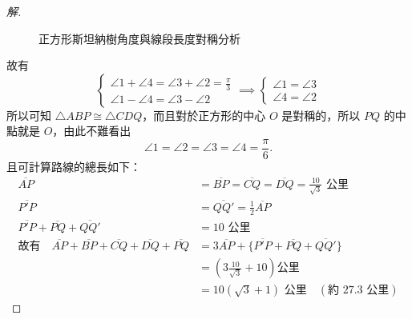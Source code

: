 \begin{proof}[解]
\begin{figure}[H]
\caption{正方形斯坦納樹角度與線段長度對稱分析}
\label{fig:5-32}
\end{figure}

故有
\[ \begin{cases} \angle 1 + \angle 4 = \angle 3 + \angle 2 = \frac{\pi}{3} \\ \angle 1 - \angle 4 = \angle 3 - \angle 2 \end{cases} \implies \begin{cases} \angle 1 = \angle 3 \\ \angle 4 = \angle 2 \end{cases} \]
所以可知 $\triangle ABP \cong \triangle CDQ$，而且對於正方形的中心 $O$ 是對稱的，所以 $PQ$ 的中點就是 $O$，由此不難看出
\[ \angle 1 = \angle 2 = \angle 3 = \angle 4 = \frac{\pi}{6}. \]
且可計算路線的總長如下：
\begin{align*}
\overline{AP} &= \overline{BP} = \overline{CQ} = \overline{DQ} = \frac{10}{\sqrt{3}} \text{ 公里} \\
\overline{P'P} &= \overline{QQ'} = \frac{1}{2}\overline{AP} \\
\overline{P'P} + \overline{PQ} + \overline{QQ'} &= 10 \text{ 公里} \\
\text{故有}\quad \overline{AP} + \overline{BP} + \overline{CQ} + \overline{DQ} + \overline{PQ} &= 3\overline{AP} + \{\overline{P'P} + \overline{PQ} + \overline{QQ'}\} \\
&= \left( 3\frac{10}{\sqrt{3}} + 10 \right) \text{公里} \\
&= 10(\sqrt{3} + 1) \text{ 公里}\quad (\text{約 } 27.3 \text{ 公里})
\end{align*}
\end{proof}

